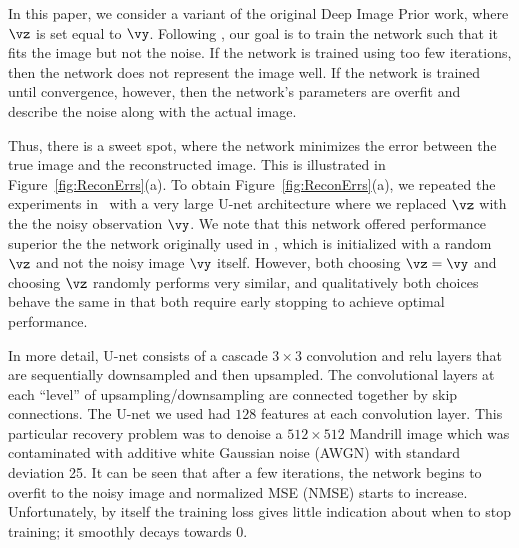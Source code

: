 \documentclass{article}
\begin{document}

In this paper, we consider a variant of the original Deep Image Prior work, where $\vz$ is set equal to $\vy$. %
Following \cite{DeepImagePrior}, our goal is to train the network such that it fits the image but not the noise. 
If the network is trained using too few iterations, then the network does not represent the image well. 
If the network is trained until convergence, however, then the network's parameters are overfit and describe the noise along with the actual image.

Thus, there is a sweet spot, where the network minimizes the error between the true image and the reconstructed image.
This is illustrated in Figure~\ref{fig:ReconErrs}(a).
To obtain Figure~\ref{fig:ReconErrs}(a), we repeated the experiments in~\cite{DeepImagePrior} with a very large U-net architecture \cite{Unet} where we replaced $\vz$ with the the noisy observation $\vy$.
We note that this network offered performance superior the the network originally used in \cite{DeepImagePrior}, which is initialized with a random $\vz$ and not the noisy image $\vy$ itself. However, both choosing $\vz=\vy$ and choosing $\vz$ randomly performs very similar, and qualitatively both choices behave the same in that both require early stopping to achieve optimal performance.

In more detail, U-net \cite{Unet} consists of a cascade $3\times 3$ convolution and relu layers that are sequentially downsampled and then upsampled. The convolutional layers at each ``level'' of upsampling/downsampling are connected together by skip connections. The U-net we used had $128$ features at each convolution layer.
This particular recovery problem was to denoise a $512\times 512$ Mandrill image which was contaminated with additive white Gaussian noise (AWGN) with standard deviation 25.
It can be seen that after a few iterations, the network begins to overfit to the noisy image and normalized MSE (NMSE) starts to increase. 
Unfortunately, by itself the training loss gives little indication about when to stop training; it smoothly decays towards $0$.
\end{document}
